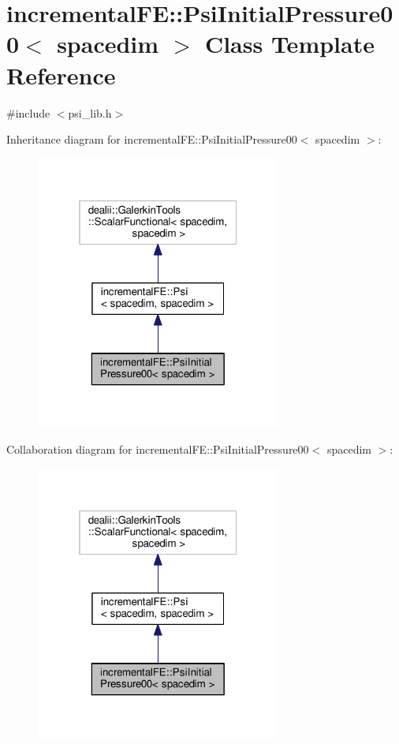 \hypertarget{classincremental_f_e_1_1_psi_initial_pressure00}{}\section{incremental\+FE\+:\+:Psi\+Initial\+Pressure00$<$ spacedim $>$ Class Template Reference}
\label{classincremental_f_e_1_1_psi_initial_pressure00}


{\ttfamily \#include $<$psi\+\_\+lib.\+h$>$}



Inheritance diagram for incremental\+FE\+:\+:Psi\+Initial\+Pressure00$<$ spacedim $>$\+:\nopagebreak
\begin{figure}[H]
\begin{center}
\leavevmode
\includegraphics[width=229pt]{classincremental_f_e_1_1_psi_initial_pressure00__inherit__graph}
\end{center}
\end{figure}


Collaboration diagram for incremental\+FE\+:\+:Psi\+Initial\+Pressure00$<$ spacedim $>$\+:\nopagebreak
\begin{figure}[H]
\begin{center}
\leavevmode
\includegraphics[width=229pt]{classincremental_f_e_1_1_psi_initial_pressure00__coll__graph}
\end{center}
\end{figure}
